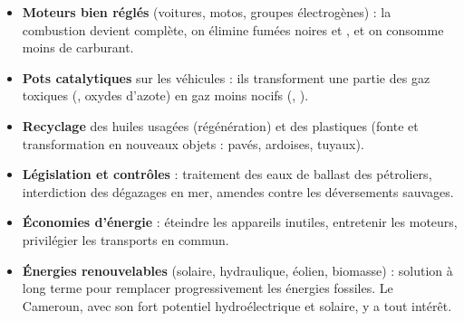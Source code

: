 \documentclass[11pt]{article}
\begin{document}
\begin{aretenir}
\begin{itemize}
\item \textbf{Moteurs bien réglés} (voitures, motos, groupes électrogènes) : la combustion devient complète, on élimine fumées noires et , et on consomme moins de carburant.
\item \textbf{Pots catalytiques} sur les véhicules : ils transforment une partie des gaz toxiques (, oxydes d'azote) en gaz moins nocifs (, ).
\item \textbf{Recyclage} des huiles usagées (régénération) et des plastiques (fonte et transformation en nouveaux objets : pavés, ardoises, tuyaux).
\item \textbf{Législation et contrôles} : traitement des eaux de ballast des pétroliers, interdiction des dégazages en mer, amendes contre les déversements sauvages.
\item \textbf{Économies d'énergie} : éteindre les appareils inutiles, entretenir les moteurs, privilégier les transports en commun.
\item \textbf{Énergies renouvelables} (solaire, hydraulique, éolien, biomasse) : solution à long terme pour remplacer progressivement les énergies fossiles. Le Cameroun, avec son fort potentiel hydroélectrique et solaire, y a tout intérêt.
\end{itemize}
\end{aretenir}
\end{document}
